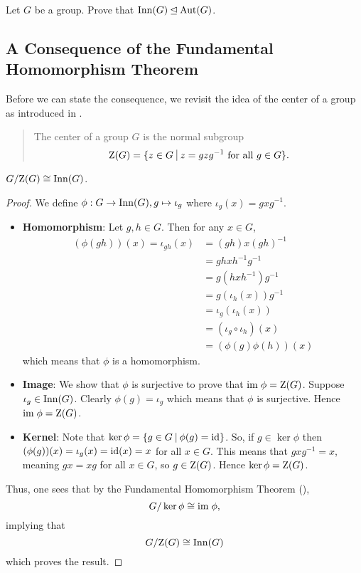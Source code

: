 \begin{exercise}
    Let $G$ be a group. Prove that $\mathrm{Inn}(G) \unlhd \mathrm{Aut}(G)$.
\end{exercise}

\subsection{A Consequence of the Fundamental Homomorphism Theorem}
Before we can state the consequence, we revisit the idea of the center of a group as introduced in .
\begin{quote}
    The center of a group $G$ is the normal subgroup
    \[
        \CenterGrp{G} = \{z \in G \vert z = gzg^{-1} \text{ for all } g \in G\}.
    \]
\end{quote}

\begin{proposition}
    $G/\mathrm{Z}(G) \cong \mathrm{Inn}(G)$.
\end{proposition}
\begin{proof}
    We define $\phi: G \to \mathrm{Inn}(G), g \mapsto \iota_g$ where $\iota_g(x) = gxg^{-1}$.
    \begin{itemize}
        \item \textbf{Homomorphism}: Let $g, h \in G$. Then for any $x \in G$,
        \begin{align*}
            (\phi(gh))(x) = \iota_{gh}(x) &= (gh)x(gh)^{-1}\\
            &= gh x h^{-1}g^{-1}\\
            &= g(hxh^{-1})g^{-1}\\
            &= g(\iota_h(x))g^{-1}\\
            &=\iota_g(\iota_h(x))\\
            &=(\iota_g\circ\iota_h)(x)\\
            &=(\phi(g)\phi(h))(x)
        \end{align*}
        which means that $\phi$ is a homomorphism.

        \item \textbf{Image}: We show that $\phi$ is surjective to prove that $\mathrm{im}\; \phi = \mathrm{Z}(G)$. Suppose $\iota_g \in \mathrm{Inn}(G)$. Clearly $\phi(g) = \iota_g$ which means that $\phi$ is surjective. Hence $\mathrm{im}\;\phi = \mathrm{Z}(G)$.

        \item \textbf{Kernel}: Note that $\ker\phi = \{g \in G \vert \phi(g) = \id\}$. So, if $g \in \ker\phi$ then $(\phi(g))(x) = \iota_g(x) = \mathrm{id}(x) = x$ for all $x \in G$. This means that $gxg^{-1} = x$, meaning $gx = xg$ for all $x \in G$, so $g \in \mathrm{Z}(G)$. Hence $\ker\phi = \mathrm{Z}(G)$.
    \end{itemize}
    Thus, one sees that by the Fundamental Homomorphism Theorem (),
    \[
        G/\ker\phi \cong \mathrm{im}\;\phi,
    \]
    implying that
    \[
        G/\mathrm{Z}(G) \cong \mathrm{Inn}(G)    
    \]
    which proves the result.
\end{proof}

